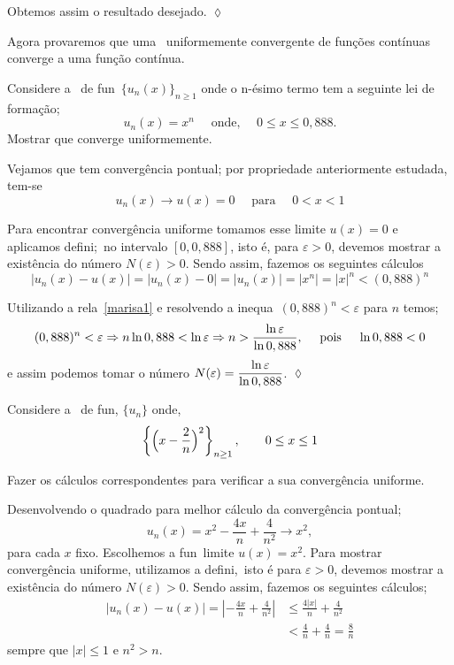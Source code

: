 Obtemos assim o resultado desejado. \hfill \(\lozenge\)

Agora provaremos que uma \seq\ uniformemente convergente de
funções contínuas converge a uma função contínua.

\begin{exer}
Considere a \seq\  de fun\coes\  $\{u_n(x)\}_{n\geq 1}$ onde o n-ésimo termo tem a seguinte lei
de forma\c c\~ao;
$$
u_n(x)= x^n \quad \text{ onde, }\quad 0\leq x \leq 0,888.
$$
Mostrar que converge uniformemente.
\end{exer}

\solo  Vejamos que tem convergência pontual; por propriedade
anteriormente estudada, tem-se
$$
u_n(x)\to u(x)=0\quad \text{ para } \quad 0<x<1
$$

Para encontrar convergência uniforme tomamos esse limite $u(x)=0$
e aplicamos defini\cao;\ no intervalo $[0, 0,888]$, isto \'e, para
$\varepsilon>0$, devemos mostrar a exist\^encia do número
$N(\varepsilon)>0$. Sendo assim, fazemos os seguintes cálculos
\begin{equation}\label{marisa1}
|u_n(x)-u(x)|=|u_n(x)-0|=|u_n(x)|=|x^n|=|x|^n<(0,888)^n
\end{equation}

Utilizando a rela\cao\ \eqref{marisa1} e resolvendo a inequa\cao\
$(0,888)^n<\varepsilon$ para $n$ temos; $$ (0,888)^n<\varepsilon
\Rightarrow n\ln 0,888<\ln \varepsilon \Rightarrow n>\frac{\ln \varepsilon}{\ln
0,888}, \quad \text{ pois }\quad \ln 0,888 <0 $$ e assim podemos
tomar o número $N(\varepsilon)=\displaystyle{\frac{\ln \varepsilon}{\ln
0,888}}$. \hfill \(\lozenge\)

\begin{exer}
 Considere a \seq\ de fun\coes, $\{u_n\}$ onde,
$$
\left\{\Bigl(x-\frac{2}{n} \Bigr)^2\right\}_{n\geq 1},\qquad 0\le x\le 1
$$

Fazer os cálculos correspondentes para verificar a sua
converg\^encia uniforme.
\end{exer}

\solo Desenvolvendo o quadrado para melhor cálculo da convergência
pontual;
$$
u_n(x)=x^2-\frac{4x}{n}+\frac{4}{n^2}\to x^2,
$$
para cada $x$ fixo. Escolhemos a fun\cao\ limite $u(x)=x^2$. Para mostrar
convergência uniforme, utilizamos a defini\cao,\ isto \'e para $\varepsilon>0$, devemos mostrar a
existência do número $N(\varepsilon)>0$. Sendo assim, fazemos os
seguintes cálculos;
\begin{equation}\label{marisa}
\begin{split}
  |u_n(x)-u(x)|=\left|-\frac{4x}{n}+\frac{4}{n^2}\right|&\leq
  \frac{4|x|}{n}+\frac{4}{n^2}\\[2ex]
  &< \frac{4}{n}+\frac{4}{n}=\frac{8}{n}
 \end{split}
\end{equation}
sempre que $|x|\leq 1$ e $n^2>n$.

